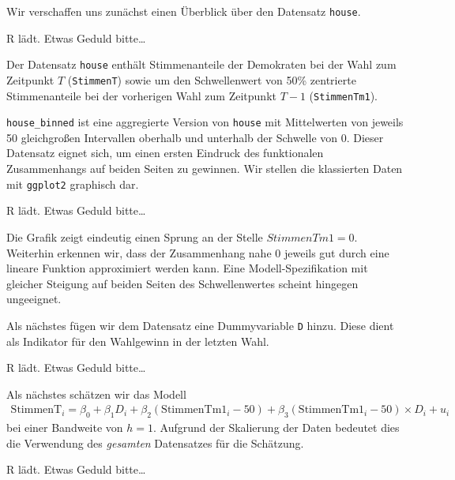 \documentclass[
  letterpaper,
  DIV=11,
  oneside]{scrreprt}
\begin{document}
Wir verschaffen uns zunächst einen Überblick über den Datensatz
\texttt{house}.

R lädt. Etwas Geduld bitte\ldots{}

\hypertarget{webr-editor-1}{}

\hypertarget{webr-code-output-1}{}

Der Datensatz \texttt{house} enthält Stimmenanteile der Demokraten bei
der Wahl zum Zeitpunkt \(T\) (\texttt{StimmenT}) sowie um den
Schwellenwert von 50\% zentrierte Stimmenanteile bei der vorherigen Wahl
zum Zeitpunkt \(T-1\) (\texttt{StimmenTm1}).

\texttt{house\_binned} ist eine aggregierte Version von \texttt{house}
mit Mittelwerten von jeweils 50 gleichgroßen Intervallen oberhalb und
unterhalb der Schwelle von 0. Dieser Datensatz eignet sich, um einen
ersten Eindruck des funktionalen Zusammenhangs auf beiden Seiten zu
gewinnen. Wir stellen die klassierten Daten mit \texttt{ggplot2}
graphisch dar.

R lädt. Etwas Geduld bitte\ldots{}

\hypertarget{webr-editor-2}{}

\hypertarget{webr-code-output-2}{}

Die Grafik zeigt eindeutig einen Sprung an der Stelle
\(StimmenTm1 = 0\). Weiterhin erkennen wir, dass der Zusammenhang nahe 0
jeweils gut durch eine lineare Funktion approximiert werden kann. Eine
Modell-Spezifikation mit gleicher Steigung auf beiden Seiten des
Schwellenwertes scheint hingegen ungeeignet.

Als nächstes fügen wir dem Datensatz eine Dummyvariable \texttt{D}
hinzu. Diese dient als Indikator für den Wahlgewinn in der letzten Wahl.

R lädt. Etwas Geduld bitte\ldots{}

\hypertarget{webr-editor-3}{}

\hypertarget{webr-code-output-3}{}

Als nächstes schätzen wir das Modell \begin{align}
  \text{StimmenT}_i = \beta_0 + \beta_1 D_i + \beta_2 (\text{StimmenTm1}_i - 50) + \beta_3(\text{StimmenTm1}_i - 50)\times D_i + u_i
\end{align} bei einer Bandweite von \(h = 1\). Aufgrund der Skalierung
der Daten bedeutet dies die Verwendung des \emph{gesamten} Datensatzes
für die Schätzung.

R lädt. Etwas Geduld bitte\ldots{}

\hypertarget{webr-editor-4}{}
\end{document}
